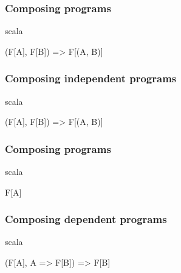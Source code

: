 \documentclass{beamer}
\begin{document}
\begin{frame}[fragile]

  \frametitle{Composing programs}

  \centering
  \Large

  \begin{cminted}{scala}

(F[A], F[B]) => F[(A, B)]

  \end{cminted}

\end{frame}

\begin{frame}[fragile]

  \frametitle{Composing independent programs}

  \centering
  \Large

  \begin{cminted}{scala}

(F[A], F[B]) => F[(A, B)]

  \end{cminted}

\end{frame}

\begin{frame}[fragile]

  \frametitle{Composing programs}

  \centering
  \Large

  \begin{cminted}{scala}

F[A]

  \end{cminted}

\end{frame}


\begin{frame}[fragile]

  \frametitle{Composing dependent programs}

  \centering
  \Large

  \begin{cminted}{scala}

(F[A], A => F[B]) => F[B]

  \end{cminted}

\end{frame}
\end{document}
